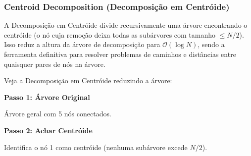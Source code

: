 \subsubsection{Centroid Decomposition (Decomposição em Centróide)}
A Decomposição em Centróide divide recursivamente uma árvore encontrando o
centróide (o nó cuja remoção deixa todas as subárvores com tamanho $\le N/2$).
Isso reduz a altura da árvore de decomposição para $\mathcal{O}(\log N)$, sendo
a ferramenta definitiva para resolver problemas de caminhos e distâncias entre
quaisquer pares de nós na árvore.

Veja a Decomposição em Centróide reduzindo a árvore:\\ \vspace{0.5cm} \noindent
\begin{minipage}[t]{0.31\textwidth}
    \centering
    \textbf{Passo 1: Árvore Original}\\
    \vspace{0.2cm}

    \vspace{0.2cm}
    \footnotesize
    \raggedright
    Árvore geral com 5 nós conectados.
\end{minipage}%
\hfill
%
\begin{minipage}[t]{0.31\textwidth}
    \centering
    \textbf{Passo 2: Achar Centróide}\\
    \vspace{0.2cm}

    \vspace{0.2cm}
    \footnotesize
    \raggedright
    Identifica o nó 1 como centróide (nenhuma subárvore excede $N/2$).
\end{minipage}%
